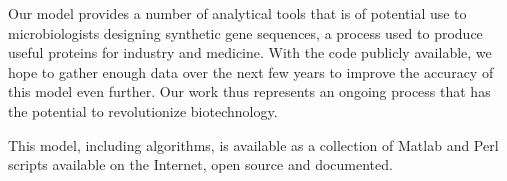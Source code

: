 \documentclass[12pt, draft]{article}
\numberwithin{equation}{section}
\begin{document}
Our model provides a number of analytical tools that
is of potential use to microbiologists designing synthetic gene sequences,
a process used to
produce useful proteins for industry and medicine.
With the code publicly available, we hope to gather enough data over the
next few years to improve the accuracy of this model even further.
Our work thus represents an ongoing process that has the potential
to revolutionize biotechnology.

This model, including algorithms, is available as a collection of
Matlab and Perl scripts available on the Internet, open source and documented.

\begin{singlespace}
  
\end{singlespace}
\end{document}
